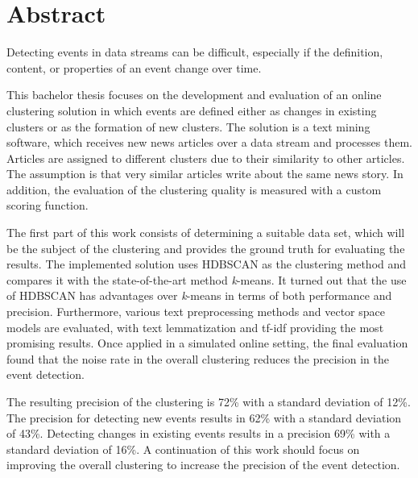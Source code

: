 \section*{Abstract}

Detecting events in data streams can be difficult,
especially if the definition, content, or properties of an event change over time.

This bachelor thesis focuses on the development and evaluation of an online clustering solution
in which events are defined either as changes in existing clusters or as the formation of new clusters.
The solution is a text mining software, which receives new news articles over a data stream and processes them.
Articles are assigned to different clusters due to their similarity to other articles.
The assumption is that very similar articles write about the same news story.
In addition, the evaluation of the clustering quality is measured with a custom scoring function.

The first part of this work consists of determining a suitable data set,
which will be the subject of the clustering and provides the ground truth for evaluating the results.
The implemented solution uses HDBSCAN as the clustering method
and compares it with the state-of-the-art method \textit{k}-means.
It turned out that the use of HDBSCAN has advantages over \textit{k}-means in terms of both performance and precision.
Furthermore, various text preprocessing methods and vector space models are evaluated,
with text lemmatization and tf-idf providing the most promising results.
Once applied in a simulated online setting,
the final evaluation found that the noise rate in the overall clustering reduces the precision in the event detection.

The resulting precision of the clustering is 72\% with a standard deviation of 12\%.
The precision for detecting new events results in 62\% with a standard deviation of 43\%.
Detecting changes in existing events results in a precision 69\% with a standard deviation of 16\%.
A continuation of this work should focus on improving the overall clustering to increase the precision of the event detection.
